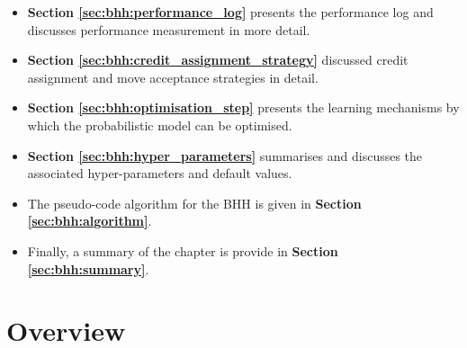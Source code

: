 \begin{itemize}
    \item \textbf{Section \ref{sec:bhh:performance_log}} presents the performance log and discusses performance measurement in more detail.
    
    \item \textbf{Section \ref{sec:bhh:credit_assignment_strategy}} discussed credit assignment and move acceptance strategies in detail.
    
    \item \textbf{Section \ref{sec:bhh:optimisation_step}} presents the learning mechanisms by which the probabilistic model can be optimised.
    
    \item \textbf{Section \ref{sec:bhh:hyper_parameters}} summarises and discusses the associated hyper-parameters and default values.
    
    \item The pseudo-code algorithm for the \ac{BHH} is given in \textbf{Section \ref{sec:bhh:algorithm}}.
    
    \item Finally, a summary of the chapter is provide in \textbf{Section \ref{sec:bhh:summary}}.
\end{itemize}


\section{Overview}
\label{sec:bhh:overview}

